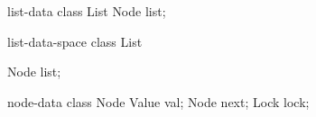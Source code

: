 \newcommand{\RefFigListClass}{\ref{fig:programs}(a)\xspace}
\newcommand{\RefFigMGC}      {\ref{fig:programs}(b)\xspace}
\newcommand{\RefFigSearch}   {\ref{fig:programs}(c)\xspace}
\newcommand{\RefFigLocate}   {\ref{fig:programs}(d)\xspace}
\newcommand{\RefFigAdd}      {\ref{fig:programs}(e)\xspace}
\newcommand{\RefFigRemove}   {\ref{fig:programs}(f)\xspace}

\newcommand{\RefFigListClassGhost}{\ref{fig:programs:ghost}(a)\xspace}
\newcommand{\RefFigLocateGhost}		{\ref{fig:programs:ghost}(b)\xspace}
\newcommand{\RefFigAddGhost}			{\ref{fig:programs:ghost}(c)\xspace}
\newcommand{\RefFigRemoveGhost}		{\ref{fig:programs:ghost}(d)\xspace}

\newcommand{\FigLabel}[1]{\multicolumn{1}{c}{#1}}
\newcommand{\FigLabelWide}[1]{\multicolumn{3}{c}{#1}}

%
%

\begin{SaveVerbatim}{list-data}
class List {
     Node list;
}
\end{SaveVerbatim}

\begin{SaveVerbatim}{list-data-space}
class List {
     Node list;

}
\end{SaveVerbatim}


\begin{SaveVerbatim}{node-data}
class Node {
     Value val;
     Node next;
     Lock lock;
}
\end{SaveVerbatim}

\newcommand{\DataStructuresBody}{
  \begin{tabular}{l}
    \renewcommand{\arraystretch}{0.4}
    $\begin{array}{l}
      \class \: \List \: \{ \\
      \mhs \Node \: \tList ;\\
      \}
    \end{array}$ \\ \\ \\
    \renewcommand{\arraystretch}{0.4}
    $\begin{array}{l}
      \class \: \Node \: \{ \\
      \mhs \Value \: \val ;\\
      \mhs \Node \: \tNext ;\\
      \mhs \Lock \: \lock ;\\
      \}
    \end{array}$
  \end{tabular}
}
\newcommand{\DataStructuresFig}{
\begin{minipage}[c]{3.7cm}
  \DataStructuresBody
\label{fig:listclass}
\end{minipage}
}


